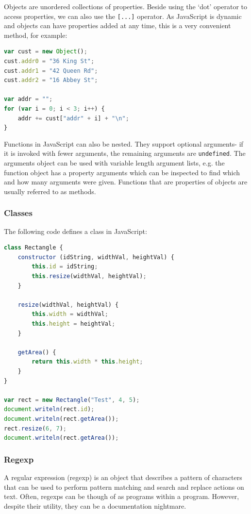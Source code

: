 \documentclass[a4paper, openany]{memoir}
\begin{document}
Objects are unordered collections of properties. Beside using the `dot' operator to access properties, we can also use the \texttt{[...]} operator. As JavaScript is dynamic and objects can have properties added at any time, this is a very convenient method, for example:
\begin{lstlisting}[language=javascript]
var cust = new Object();
cust.addr0 = "36 King St";
cust.addr1 = "42 Queen Rd";
cust.addr2 = "16 Abbey St";

var addr = "";
for (var i = 0; i < 3; i++) {
    addr += cust["addr" + i] + "\n";
}
\end{lstlisting}
Functions in JavaScript can also be nested. They support optional arguments- if it is invoked with fewer arguments, the remaining arguments are \texttt{undefined}. The arguments object can be used with variable length argument lists, e.g. the function object has a property arguments which can be inspected to find which and how many arguments were given. Functions that are properties of objects are usually referred to as methods.

\subsubsection{Classes}
The following code defines a class in JavaScript:
\begin{lstlisting}[language=javascript]
class Rectangle {
    constructor (idString, widthVal, heightVal) {
        this.id = idString;
        this.resize(widthVal, heightVal);
    }
    
    resize(widthVal, heightVal) {
        this.width = widthVal;
        this.height = heightVal;
    }
    
    getArea() {
        return this.width * this.height;
    }
}

var rect = new Rectangle("Test", 4, 5);
document.writeln(rect.id);
document.writeln(rect.getArea());
rect.resize(6, 7);
document.writeln(rect.getArea());
\end{lstlisting}

\subsubsection{Regexp}
A regular expression (regexp) is an object that describes a pattern of characters that can be used to perform pattern matching and search and replace actions on text. Often, regexps can be though of as programs within a program. However, despite their utility, they can be a documentation nightmare.
\end{document}
